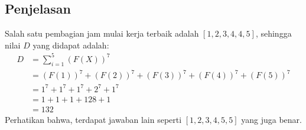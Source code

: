 \documentclass{article}
\begin{document}
\subsection*{Penjelasan}

Salah satu pembagian jam mulai kerja terbaik adalah $\left[1, 2, 3, 4, 4, 5\right]$, sehingga nilai $D$ yang didapat adalah:
\begin{align*}
D &= \sum_{i = 1}^{5} (F(X))^7 \\
  &= (F(1))^7 + (F(2))^7 + (F(3))^7 + (F(4))^7 + (F(5))^7 \\
  &= 1^7 + 1^7 + 1^7 + 2^7 + 1^7 \\
  &= 1 + 1 + 1 + 128 + 1 \\
  &= 132
\end{align*}
Perhatikan bahwa, terdapat jawaban lain seperti $\left[1, 2, 3, 4, 5, 5\right]$ yang juga benar.
\end{document}
